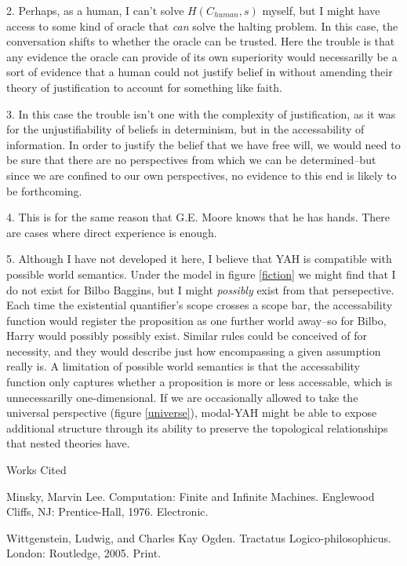 \documentclass[12pt]{article}
\newcommand{\bibent}{\noindent \hangindent 40pt}
\newenvironment{workscited}{\newpage \begin{center} Works Cited \end{center}}{\newpage }
\begin{document}
\begin{flushleft}
2. Perhaps, as a human, I can't solve $H(C_{human}, s)$ myself, but I might have access to some kind of oracle that \textit{can} solve the halting problem.  In this case, the conversation shifts to whether the oracle can be trusted.  Here the trouble is that any evidence the oracle can provide of its own superiority would necessarilly be a sort of evidence that a human could not justify belief in without amending their theory of justification to account for something like faith.

3. In this case the trouble isn't one with the complexity of justification, as it was for the unjustifiability of beliefs in determinism, but in the accessability of information.  In order to justify the belief that we have free will, we would need to be sure that there are no perspectives from which we can be determined--but since we are confined to our own perspectives, no evidence to this end is likely to be forthcoming.

4. This is for the same reason that G.E. Moore knows that he has hands.  There are cases where direct experience is enough.

5. Although I have not developed it here, I believe that YAH is compatible with possible world semantics.  Under the model in figure \ref{fiction} we might find that I do not exist for Bilbo Baggins, but I might \textit{possibly} exist from that persepective.  Each time the existential quantifier's scope crosses a scope bar, the accessability function would register the proposition as one further world away--so for Bilbo, Harry would possibly possibly exist.  Similar rules could be conceived of for necessity, and they would describe just how encompassing a given assumption really is.  A limitation of possible world semantics is that the accessability function only captures whether a proposition is more or less accessable, which is unnecessarilly one-dimensional.  If we are occasionally allowed to take the universal perspective (figure \ref{universe}), modal-YAH might be able to expose additional structure through its ability to preserve the topological relationships that nested theories have.



\begin{workscited}
    \bibent Minsky, Marvin Lee. Computation: Finite and Infinite Machines. Englewood Cliffs, NJ: Prentice-Hall, 1976. Electronic.

    \bibent Wittgenstein, Ludwig, and Charles Kay Ogden. Tractatus Logico-philosophicus. London: Routledge, 2005. Print.


\end{workscited}
\end{flushleft}
\end{document}
